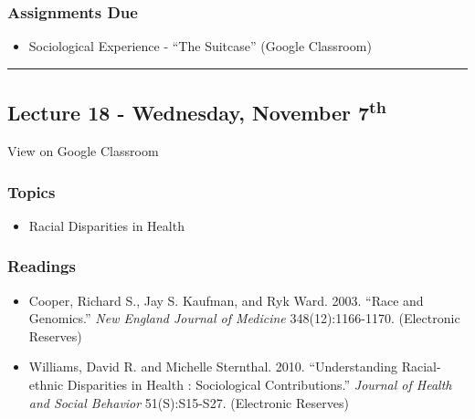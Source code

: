 \documentclass[]{book}
\providecommand{\tightlist}{%
  \setlength{\itemsep}{0pt}\setlength{\parskip}{0pt}}
\theoremstyle{definition}
\theoremstyle{definition}
\theoremstyle{definition}
\theoremstyle{remark}
\begin{document}
\hypertarget{assignments-due-4}{%
\subsubsection*{Assignments Due}\label{assignments-due-4}}

\begin{itemize}
\tightlist
\item
  Sociological Experience - ``The Suitcase'' (Google Classroom)
\end{itemize}

\begin{center}\rule{0.5\linewidth}{\linethickness}\end{center}

\hypertarget{lecture-18---wednesday-november-7th}{%
\subsection*{\texorpdfstring{Lecture 18 - Wednesday, November
7\textsuperscript{th}}{Lecture 18 - Wednesday, November 7th}}\label{lecture-18---wednesday-november-7th}}

View on Google Classroom

\hypertarget{topics-21}{%
\subsubsection*{Topics}\label{topics-21}}

\begin{itemize}
\tightlist
\item
  Racial Disparities in Health
\end{itemize}

\hypertarget{readings-19}{%
\subsubsection*{Readings}\label{readings-19}}

\begin{itemize}
\tightlist
\item
  Cooper, Richard S., Jay S. Kaufman, and Ryk Ward. 2003. ``Race and
  Genomics.'' \emph{New England Journal of Medicine} 348(12):1166-1170.
  (Electronic Reserves)
\item
  Williams, David R. and Michelle Sternthal. 2010. ``Understanding
  Racial-ethnic Disparities in Health : Sociological Contributions.''
  \emph{Journal of Health and Social Behavior} 51(S):S15-S27.
  (Electronic Reserves)
\end{itemize}
\end{document}
